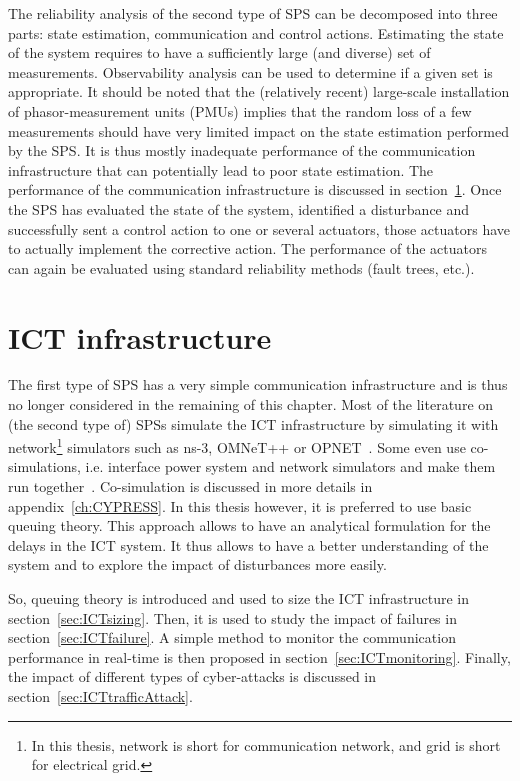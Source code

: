 The reliability analysis of the second type of SPS can be decomposed into three parts: state estimation, communication and control actions. Estimating the state of the system requires to have a sufficiently large (and diverse) set of measurements. Observability analysis can be used to determine if a given set is appropriate. It should be noted that the (relatively recent) large-scale installation of phasor-measurement units (PMUs) implies that the random loss of a few measurements should have very limited impact on the state estimation performed by the SPS. It is thus mostly inadequate performance of the communication infrastructure that can potentially lead to poor state estimation. The performance of the communication infrastructure is discussed in section~\ref{sec:SPS-ICT}. Once the SPS has evaluated the state of the system, identified a disturbance and successfully sent a control action to one or several actuators, those actuators have to actually implement the corrective action. The performance of the actuators can again be evaluated using standard reliability methods (fault trees, etc.).

\section{ICT infrastructure}
\label{sec:SPS-ICT}

The first type of SPS has a very simple communication infrastructure and is thus no longer considered in the remaining of this chapter. Most of the literature on (the second type of) SPSs simulate the ICT infrastructure by simulating it with network\footnote{In this thesis, network is short for communication network, and grid is short for electrical grid.} simulators such as ns-3, OMNeT++ or OPNET~\cite{SPS-Ciapessoni}. Some even use co-simulations, i.e. interface power system and network simulators and make them run together~\cite{SPS-MingNi, GECOtestcase}. Co-simulation is discussed in more details in appendix~\ref{ch:CYPRESS}. In this thesis however, it is preferred to use basic queuing theory. This approach allows to have an analytical formulation for the delays in the ICT system. It thus allows to have a better understanding of the system and to explore the impact of disturbances more easily.

So, queuing theory is introduced and used to size the ICT infrastructure in section~\ref{sec:ICTsizing}. Then, it is used to study the impact of failures in section~\ref{sec:ICTfailure}. A simple method to monitor the communication performance in real-time is then proposed in section~\ref{sec:ICTmonitoring}. Finally, the impact of different types of cyber-attacks is discussed in section~\ref{sec:ICTtrafficAttack}.


